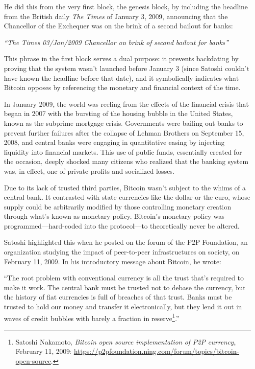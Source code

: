 \documentclass[
  a5paper,
  smalldemyvopaper,10pt,twoside,onecolumn,openright,extrafontsizes,hidelinks]{memoir}
\begin{document}
He did this from the very first block, the genesis block, by including
the headline from the British daily \emph{The Times} of January 3, 2009,
announcing that the Chancellor of the Exchequer was on the brink of a
second bailout for banks:

\emph{``The Times 03/Jan/2009 Chancellor on brink of second bailout for
banks''}

This phrase in the first block serves a dual purpose: it prevents
backdating by proving that the system wasn't launched before January 3
(since Satoshi couldn't have known the headline before that date), and
it symbolically indicates what Bitcoin opposes by referencing the
monetary and financial context of the time.

In January 2009, the world was reeling from the effects of the financial
crisis that began in 2007 with the bursting of the housing bubble in the
United States, known as the subprime mortgage crisis. Governments were
bailing out banks to prevent further failures after the collapse of
Lehman Brothers on September 15, 2008, and central banks were engaging
in quantitative easing by injecting liquidity into financial markets.
This use of public funds, essentially created for the occasion, deeply
shocked many citizens who realized that the banking system was, in
effect, one of private profits and socialized losses.

Due to its lack of trusted third parties, Bitcoin wasn't subject to the
whims of a central bank. It contrasted with state currencies like the
dollar or the euro, whose supply could be arbitrarily modified by those
controlling monetary creation through what's known as monetary policy.
Bitcoin's monetary policy was programmed---hard-coded into the
protocol---to theoretically never be altered.

Satoshi highlighted this when he posted on the forum of the P2P
Foundation, an organization studying the impact of peer-to-peer
infrastructures on society, on February 11, 2009. In his introductory
message about Bitcoin, he wrote:

``The root problem with conventional currency is all the trust that's
required to make it work. The central bank must be trusted not to debase
the currency, but the history of fiat currencies is full of breaches of
that trust. Banks must be trusted to hold our money and transfer it
electronically, but they lend it out in waves of credit bubbles with
barely a fraction in reserve\footnote{Satoshi Nakamoto, \emph{Bitcoin
  open source implementation of P2P currency}, February 11, 2009:
  \url{https://p2pfoundation.ning.com/forum/topics/bitcoin-open-source}.}.''
\end{document}
